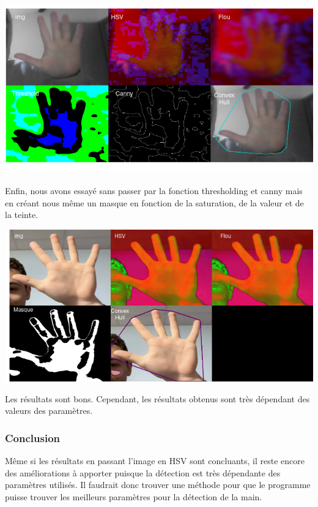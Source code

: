 \documentclass[11pt]{article}
\begin{document}
\includegraphics[width=\textwidth]{images/pre_ttt_5.png}

\bigbreak

Enfin, nous avons essayé sans passer par la fonction thresholding et canny mais en créant nous même un masque en fonction de la saturation, de la valeur et de la teinte. \bigbreak

\includegraphics[width=\textwidth]{images/pre_ttt_6.png}

\bigbreak

Les résultats sont bons. Cependant, les résultats obtenus sont très dépendant des valeurs des paramètres. 

\subsubsection{Conclusion}
Même si les résultats en passant l'image en HSV sont concluants, il reste encore des améliorations à apporter puisque la détection est très dépendante des paramètres utilisés. Il faudrait donc trouver une méthode pour que le programme puisse trouver les meilleurs paramètres pour la détection de la main. \bigbreak
\end{document}
